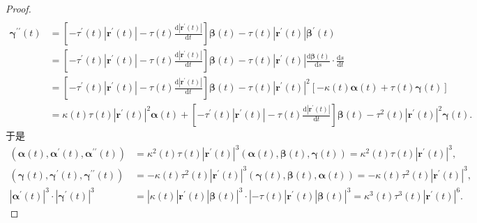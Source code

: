 \documentclass[../../main.tex]{subfiles}%
\begin{document}
\begin{proof}
\begin{align*}
\end{align*}
\begin{align*}
\bm{\gamma}^{\prime\prime}\left(t\right)&=\left[-\tau^\prime\left(t\right)\left|\bm{r}^\prime\left(t\right)\right|-\tau\left(t\right)\frac{\mathrm{d}\left|\bm{r}^\prime\left(t\right)\right|}{\mathrm{d}t}\right]\bm{\beta}\left(t\right)-\tau\left(t\right)\left|\bm{r}^\prime\left(t\right)\right|\bm{\beta}^\prime\left(t\right)\\
&=\left[-\tau^\prime\left(t\right)\left|\bm{r}^\prime\left(t\right)\right|-\tau\left(t\right)\frac{\mathrm{d}\left|\bm{r}^\prime\left(t\right)\right|}{\mathrm{d}t}\right]\bm{\beta}\left(t\right)-\tau\left(t\right)\left|\bm{r}^\prime\left(t\right)\right|\frac{\mathrm{d}\bm{\beta}\left(t\right)}{\mathrm{d}s}\cdot\frac{\mathrm{d}s}{\mathrm{d}t}\\
&=\left[-\tau^\prime\left(t\right)\left|\bm{r}^\prime\left(t\right)\right|-\tau\left(t\right)\frac{\mathrm{d}\left|\bm{r}^\prime\left(t\right)\right|}{\mathrm{d}t}\right]\bm{\beta}\left(t\right)-\tau\left(t\right)\left|\bm{r}^\prime\left(t\right)\right|^2\left[-\kappa\left(t\right)\bm{\alpha}\left(t\right)+\tau\left(t\right)\bm{\gamma}\left(t\right)\right]\\
&=\kappa\left(t\right)\tau\left(t\right)\left|\bm{r}^\prime\left(t\right)\right|^2\bm{\alpha}\left(t\right)+\left[-\tau^\prime\left(t\right)\left|\bm{r}^\prime\left(t\right)\right|-\tau\left(t\right)\frac{\mathrm{d}\left|\bm{r}^\prime\left(t\right)\right|}{\mathrm{d}t}\right]\bm{\beta}\left(t\right)-\tau^2\left(t\right)\left|\bm{r}^\prime\left(t\right)\right|^2\bm{\gamma}\left(t\right).
\end{align*}
于是
\begin{align*}
\left(\bm{\alpha}\left(t\right),\bm{\alpha}^\prime\left(t\right),\bm{\alpha}^{\prime\prime}\left(t\right)\right)&=\kappa^2\left(t\right)\tau\left(t\right)\left|\bm{r}^\prime\left(t\right)\right|^3\left(\bm{\alpha}\left(t\right),\bm{\beta}\left(t\right),\bm{\gamma}\left(t\right)\right)=\kappa^2\left(t\right)\tau\left(t\right)\left|\bm{r}^\prime\left(t\right)\right|^3,\\
\left(\bm{\gamma}\left(t\right),\bm{\gamma}^\prime\left(t\right),\bm{\gamma}^{\prime\prime}\left(t\right)\right)&=-\kappa\left(t\right)\tau^2\left(t\right)\left|\bm{r}^\prime\left(t\right)\right|^3\left(\bm{\gamma}\left(t\right),\bm{\beta}\left(t\right),\bm{\alpha}\left(t\right)\right)=-\kappa\left(t\right)\tau^2\left(t\right)\left|\bm{r}^\prime\left(t\right)\right|^3,\\
\left|\bm{\alpha}^\prime\left(t\right)\right|^3\cdot\left|\bm{\gamma}^\prime\left(t\right)\right|^3&=\left|\kappa\left(t\right)\left|\bm{r}^\prime\left(t\right)\right|\bm{\beta}\left(t\right)\right|^3\cdot\left|-\tau\left(t\right)\left|\bm{r}^\prime\left(t\right)\right|\bm{\beta}\left(t\right)\right|^3=\kappa^3\left(t\right)\tau^3\left(t\right)\left|\bm{r}^\prime\left(t\right)\right|^6.

\end{align*}
\end{proof}
\end{document}
